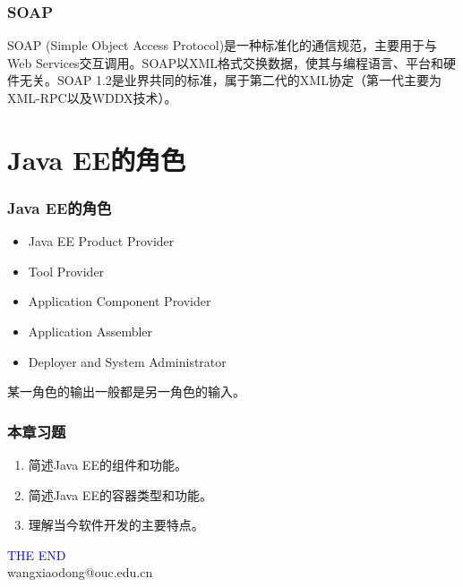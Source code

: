 \begin{frame}
\frametitle{SOAP} 
\kai
{}

SOAP (Simple Object Access Protocol)是一种标准化的通信规范，主要用于与Web Services交互调用。SOAP以XML格式交换数据，使其与编程语言、平台和硬件无关。SOAP 1.2是业界共同的标准，属于第二代的XML协定（第一代主要为XML-RPC以及WDDX技术）。
\end{frame}

\section{Java EE的角色}

\begin{frame}
\frametitle{Java EE的角色} 
\begin{itemize}[<+-| alert@+>]
\item Java EE Product Provider\\

\item Tool Provider\\

\item Application Component Provider\\

\item Application Assembler\\

\item Deployer and System Administrator\\
\end{itemize}

某一角色的输出一般都是另一角色的输入。

\end{frame}
\begin{frame}
\frametitle{} 

\end{frame}
\begin{frame}
\frametitle{本章习题}
\begin{enumerate}
\item 简述Java EE的组件和功能。
\item 简述Java EE的容器类型和功能。
\item 理解当今软件开发的主要特点。
\end{enumerate}
\end{frame}

\begin{frame}
\centering
{\Huge \textcolor{blue}{THE END}} \\
\vspace{5mm}
{\Large wangxiaodong@ouc.edu.cn} \\
\end{frame}

